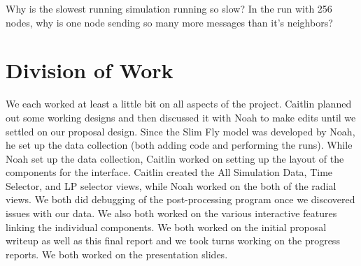 \documentclass{acm_proc_article-sp}
\begin{document}
Why is the slowest running simulation running so slow?
In the run with 256 nodes, why is one node sending so many more messages than it's neighbors?

\section{Division of Work}
We each worked at least a little bit on all aspects of the project.  Caitlin planned out some working designs and then discussed it with Noah to make edits until we settled on our proposal design.  Since the Slim Fly model was developed by Noah, he set up the data collection (both adding code and performing the runs).  While Noah set up the data collection, Caitlin worked on setting up the layout of the components for the interface.  Caitlin created the All Simulation Data, Time Selector, and LP selector views, while Noah worked on the both of the radial views.  We both did debugging of the post-processing program once we discovered issues with our data.  We also both worked on the various interactive features linking the individual components.  We both worked on the initial proposal writeup as well as this final report and we took turns working on the progress reports.  We both worked on the presentation slides.  





%

%
%


\end{document}
